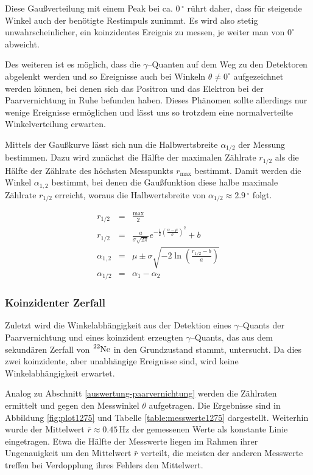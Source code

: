 \documentclass[12pt,a4paper]{scrartcl}
\numberwithin{equation}{section} %
\begin{document}
Diese Gaußverteilung mit einem Peak bei ca. $0\,^\circ$ rührt daher, dass für steigende Winkel auch der benötigte Restimpuls zunimmt. Es wird also stetig unwahrscheinlicher, ein koinzidentes Ereignis zu messen, je weiter man von $0^\circ$ abweicht.

Des weiteren ist es möglich, dass die $\gamma$--Quanten auf dem Weg zu den Detektoren abgelenkt werden und so Ereignisse auch bei Winkeln $\theta\neq 0^\circ$ aufgezeichnet werden können, bei denen sich das Positron und das Elektron bei der Paarvernichtung in Ruhe befunden haben. Dieses Phänomen sollte allerdings nur wenige Ereignisse ermöglichen und lässt uns so trotzdem eine normalverteilte Winkelverteilung erwarten.

Mittels der Gaußkurve lässt sich nun die Halbwertsbreite $\alpha_{1/2}$ der Messung bestimmen. Dazu wird zunächst die Hälfte der maximalen Zählrate $r_{1/2}$ als die Hälfte der Zählrate des höchsten Messpunkts $r_\mathrm{max}$ bestimmt. Damit werden die Winkel $\alpha_{1,2}$ bestimmt, bei denen die Gaußfunktion diese halbe maximale Zählrate $r_{1/2}$ erreicht, woraus die Halbwertsbreite von $\alpha_{1/2}\approx 2.9\,^\circ$ folgt.

\begin{eqnarray}
	r_{1/2} &=& \frac{\mathrm{max}}{2} \\
	r_{1/2} &=& \frac{a}{\sigma \sqrt{2 \pi}} e^{- \frac{1}{2} \left( \frac{\alpha - \mu}{\sigma} \right)^2} + b \\
	\alpha_{1,2} &=& \mu \pm \sigma \sqrt{-2 \ln \left( \frac{r_{1/2} - b}{a} \right) } \\
	\alpha_{1/2} &=& \alpha_1 - \alpha_2
\end{eqnarray}

\subsubsection{Koinzidenter Zerfall}
Zuletzt wird die Winkelabhängigkeit aus der Detektion eines $\gamma$--Quants der Paarvernichtung und eines koinzident erzeugten $\gamma$--Quants, das aus dem sekundären Zerfall von $\ce{^{22}Ne}$ in den Grundzustand stammt, untersucht. Da dies zwei koinzidente, aber unabhängige Ereignisse sind, wird keine Winkelabhängigkeit erwartet.

Analog zu Abschnitt \ref{auswertung-paarvernichtung} werden die Zählraten ermittelt und gegen den Messwinkel $\theta$ aufgetragen. Die Ergebnisse sind in Abbildung \ref{fig:plot1275} und Tabelle \ref{table:messwerte1275} dargestellt. Weiterhin wurde der Mittelwert $\bar r\approx 0.45\,\mathrm{Hz}$ der gemessenen Werte als konstante Linie eingetragen. Etwa die Hälfte der Messwerte liegen im Rahmen ihrer Ungenauigkeit um den Mittelwert $\bar r$ verteilt, die meisten der anderen Messwerte treffen bei Verdopplung ihres Fehlers den Mittelwert.
\end{document}
